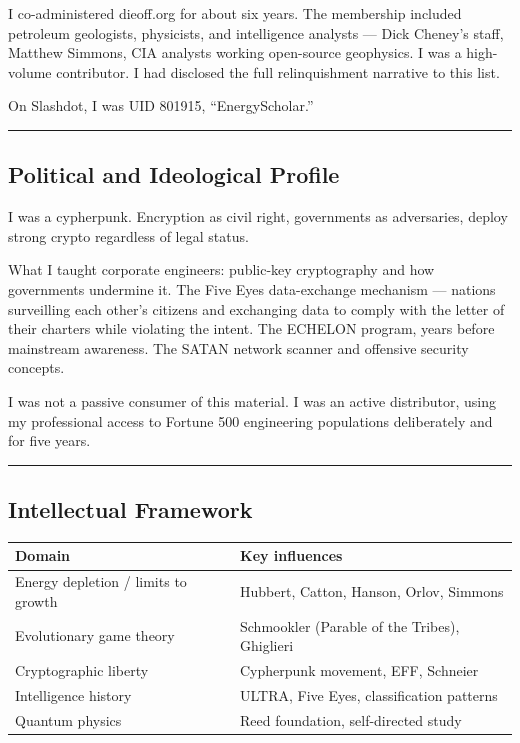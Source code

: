 I co-administered dieoff.org for about six years. The membership included petroleum geologists, physicists, and intelligence analysts --- Dick Cheney's staff, Matthew Simmons, CIA analysts working open-source geophysics. I was a high-volume contributor. I had disclosed the full relinquishment narrative to this list.

On Slashdot, I was UID 801915, ``EnergyScholar.''

\vspace{1cm}\hrule\vspace{1cm}

\subsection*{Political and Ideological Profile}
\label{record:tgt-political-activity-ideological-profile}

I was a cypherpunk. Encryption as civil right, governments as adversaries, deploy strong crypto regardless of legal status.

What I taught corporate engineers: public-key cryptography and how governments undermine it. The Five Eyes data-exchange mechanism --- nations surveilling each other's citizens and exchanging data to comply with the letter of their charters while violating the intent. The ECHELON program, years before mainstream awareness. The SATAN network scanner and offensive security concepts.

I was not a passive consumer of this material. I was an active distributor, using my professional access to Fortune 500 engineering populations deliberately and for five years.

\vspace{1cm}\hrule\vspace{1cm}

\subsection*{Intellectual Framework}
\label{record:tgt-intellectual-framework}

{%
\small
\begin{tabular}{p{4.5cm} p{9cm}}
\hline
\textbf{Domain} & \textbf{Key influences} \\
\hline
Energy depletion / limits to growth & Hubbert, Catton, Hanson, Orlov, Simmons \\
Evolutionary game theory & Schmookler (Parable of the Tribes), Ghiglieri \\
Cryptographic liberty & Cypherpunk movement, EFF, Schneier \\
Intelligence history & ULTRA, Five Eyes, classification patterns \\
Quantum physics & Reed foundation, self-directed study \\
\hline
\end{tabular}
}%

